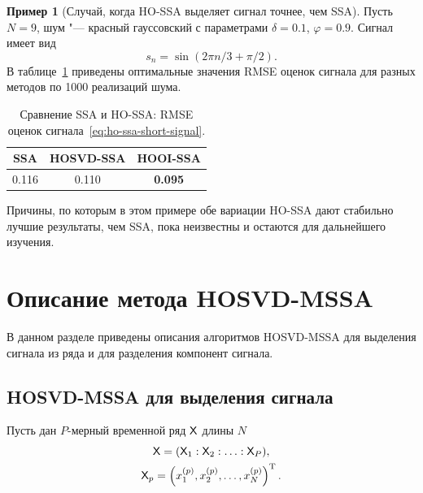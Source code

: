 \documentclass[specialist,
    substylefile=spbu.rtx,
    subf,href,colorlinks=true, 12pt]{disser}
\theoremstyle{plain}
\theoremstyle{definition}
\newtheorem{example}{Пример}[section]
\theoremstyle{remark}
\begin{document}
    \FloatBarrier

    \begin{example}[Случай, когда HO-SSA выделяет сигнал точнее, чем SSA]
        Пусть $N = 9$, шум "--- красный гауссовский с параметрами $\delta = 0.1$, $\varphi = 0.9$.
        Сигнал имеет вид
        \begin{equation}
            \label{eq:ho-ssa-short-signal}
            s_n = \sin(2\pi n/3 + \pi /2).
        \end{equation}
        В таблице~\ref{tab:tssa-better-ssa} приведены оптимальные значения RMSE оценок сигнала для разных методов
        по 1000 реализаций шума.
        \begin{table}[!ht]
            \centering
            \caption{Сравнение SSA и HO-SSA: RMSE оценок сигнала~\eqref{eq:ho-ssa-short-signal}.}
            \begin{tabular}{ccc}
                \hline
                SSA   & HOSVD-SSA & HOOI-SSA       \\
                \hline
                0.116 & 0.110     & \textbf{0.095} \\
                \hline
            \end{tabular}\label{tab:tssa-better-ssa}
        \end{table}

        Причины, по которым в этом примере обе вариации HO-SSA дают стабильно лучшие результаты, чем SSA, пока неизвестны
        и остаются для дальнейшего изучения.
    \end{example}


    \section{Описание метода HOSVD-MSSA}\label{sec:Tensor-MSSA-method-description}
    В данном разделе приведены описания алгоритмов HOSVD-MSSA для выделения сигнала из ряда и для разделения компонент сигнала.
    \subsection{HOSVD-MSSA для выделения сигнала}\label{subsec:Tensor-MSSA-method-signal-description}
    Пусть дан $P$-мерный временной ряд $\mathsf{X}$ длины $N$
    \begin{gather*}
        \mathsf{X} = (\mathsf{X}_1: \mathsf{X}_2: \ldots: \mathsf{X}_P), \\
        \mathsf{X}_p = \left(x_1^{(p)}, x_2^{(p)}, \ldots, x_N^{(p)}\right)^{\mathrm{T}}.
    \end{gather*}
\end{document}
